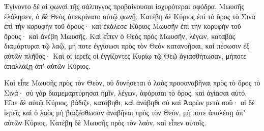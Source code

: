 {Ἐγίνοντο δὲ αἱ φωναὶ τῆς σάλπιγγος προβαίνουσαι ἰσχυρότεραι σφόδρα. Μωυσῆς ἐλάλησεν, ὁ δὲ Θεὸς ἀπεκρίνατο αὐτῷ φωνῇ.
Κατέβη δὲ Κύριος ἐπὶ τὸ ὄρος τὸ Σινὰ ἐπὶ τὴν κορυφὴν τοῦ ὄρους· καὶ ἐκάλεσε Κύριος Μωυσῆν ἐπὶ τὴν κορυφὴν τοῦ ὄρους· καὶ ἀνέβη Μωυσῆς.
Καὶ εἶπεν ὁ Θεὸς πρὸς Μωυσῆν, λέγων, καταβὰς διαμάρτυραι τῷ λαῷ, μή ποτε ἐγγίσωσι πρὸς τὸν Θεὸν κατανοῆσαι, καὶ πέσωσιν ἐξ αὐτῶν πλῆθος·
Καὶ οἱ ἱερεῖς οἱ ἐγγίζοντες Κυρίῳ τῷ Θεῷ ἁγιασθήτωσαν, μήποτε ἀπαλλάξῃ ἀπʼ αὐτῶν Κύριος.
\par }{\PP {}Καὶ εἶπε Μωυσῆς πρὸς τὸν Θεὸν, οὐ δυνήσεται ὁ λαὸς προσαναβῆναι πρὸς τὸ ὄρος τὸ Σινά· σὺ γὰρ διαμεμαρτύρησαι ἡμῖν, λέγων, ἀφόρισαι τὸ ὄρος, καὶ ἁγίασαι αὐτό.
Εἴπε δὲ αὐτῷ Κύριος, βάδιζε, κατάβηθι, καὶ ἀνάβηθι σὺ καὶ Ἀαρὼν μετὰ σοῦ· οἱ δὲ ἱερεῖς καὶ ὁ λαὸς μὴ βιαζέσθωσαν ἀναβῆναι πρὸς τὸν Θεὸν, μὴ ποτε ἀπολέσῃ ἀπʼ αὐτῶν Κύριος.
Κατέβη δὲ Μωυσῆς πρὸς τὸν λαὸν, καὶ εἶπεν αὐτοῖς.

}
